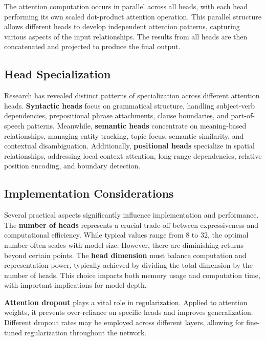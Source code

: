 The attention computation occurs in parallel across all heads, with each head performing its own scaled dot-product attention operation. This parallel structure allows different heads to develop independent attention patterns, capturing various aspects of the input relationships. The results from all heads are then concatenated and projected to produce the final output.

\subsection{Head Specialization}
\noindent
Research has revealed distinct patterns of specialization across different attention heads. \textbf{Syntactic heads} focus on grammatical structure, handling subject-verb dependencies, prepositional phrase attachments, clause boundaries, and part-of-speech patterns. Meanwhile, \textbf{semantic heads} concentrate on meaning-based relationships, managing entity tracking, topic focus, semantic similarity, and contextual disambiguation. Additionally, \textbf{positional heads} specialize in spatial relationships, addressing local context attention, long-range dependencies, relative position encoding, and boundary detection.

\subsection{Implementation Considerations}
\noindent
Several practical aspects significantly influence implementation and performance. The \textbf{number of heads} represents a crucial trade-off between expressiveness and computational efficiency. While typical values range from 8 to 32, the optimal number often scales with model size. However, there are diminishing returns beyond certain points. The \textbf{head dimension} must balance computation and representation power, typically achieved by dividing the total dimension by the number of heads. This choice impacts both memory usage and computation time, with important implications for model depth.

\textbf{Attention dropout} plays a vital role in regularization. Applied to attention weights, it prevents over-reliance on specific heads and improves generalization. Different dropout rates may be employed across different layers, allowing for fine-tuned regularization throughout the network.

